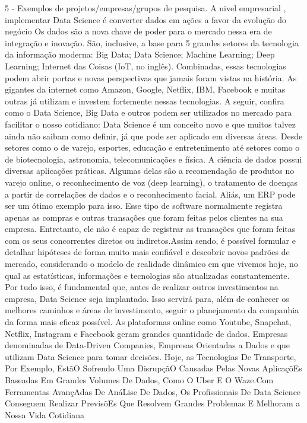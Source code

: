 5 - Exemplos de projetos/empresas/grupos de pesquisa.
A nivel empresarial , implementar Data Science é converter dados em ações a favor da evolução do negócio
Os dados são a nova chave de poder para o mercado nessa era de integração e inovação. São, inclusive, a base para 5 grandes setores da tecnologia da informação moderna:
Big Data;
Data Science;
Machine Learning;
Deep Learning;
Internet das Coisas (IoT, no inglês).
Combinadas, essas tecnologias podem abrir portas e novas perspectivas que jamais foram vistas na história.
As gigantes da internet como Amazon, Google, Netflix, IBM, Facebook e muitas outras já utilizam e investem fortemente nessas tecnologias. A seguir, confira como o Data Science, Big Data e outros podem ser utilizados no mercado para facilitar o nosso cotidiano:
Data Science é um conceito novo e que muitos talvez ainda não saibam como definir, já que pode ser aplicado em diversas áreas. Desde setores como o de varejo, esportes, educação e entretenimento até setores como o de biotecnologia, astronomia, telecomunicações e física.
A ciência de dados possui diversas aplicações práticas. Algumas delas são a recomendação de produtos no varejo online, o reconhecimento de voz (deep learning), o tratamento de doenças a partir de correlações de dados e o reconhecimento facial.
Aliás, um ERP pode ser um ótimo exemplo para isso. Esse tipo de software normalmente registra apenas as compras e outras transações que foram feitas pelos clientes na sua empresa. Entretanto, ele não é capaz de registrar as transações que foram feitas com os seus concorrentes diretos ou indiretos.Assim sendo, é possível formular e detalhar hipóteses de forma muito mais confiável e descobrir novos padrões de mercado, considerando o modelo de realidade dinâmico em que vivemos hoje, no qual as estatísticas, informações e tecnologias são atualizadas constantemente.
Por tudo isso, é fundamental que, antes de realizar outros investimentos na empresa, Data Science seja implantado. Isso servirá para, além de conhecer os melhores caminhos e áreas de investimento, seguir o planejamento da companhia da forma mais eficaz possível.
As plataformas online como Youtube, Snapchat,  Netflix,  Instagram e Facebook  geram grandes quantidade de dados. Empresas denominadas de Data-Driven Companies, Empresas Orientadas a Dados e que utilizam  Data Science para tomar decisões. Hoje, as Tecnologias De Transporte, Por Exemplo, EstãO Sofrendo Uma DisrupçãO Causadas Pelas Novas AplicaçõEs Baseadas Em Grandes Volumes De Dados, Como O Uber E O Waze.Com Ferramentas AvançAdas De AnáLise De Dados, Os Profissionais De Data Science Conseguem Realizar PrevisõEs Que Resolvem Grandes Problemas E Melhoram a Nossa Vida Cotidiana
